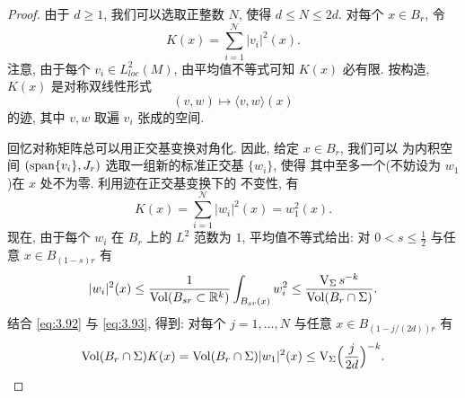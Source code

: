 \begin{proof}
由于 $d\geq1$, 我们可以选取正整数 $N$, 使得 $d\leq N\leq2d$. 对每个
$x\in B_r$, 令
\begin{equation}
K(x)=\sum_{i=1}^{\mathcal{N}}|v_i|^2(x).
\label{eq:3.90}
\end{equation}
注意, 由于每个 $v_i\in L^2_{loc}(M)$, 由平均值不等式可知 $K(x)$ 必有限.
按构造, $K(x)$ 是对称双线性形式
\begin{equation}
(v,w)\mapsto\langle v,w\rangle(x)
\label{eq:3.91}
\end{equation}
的迹, 其中 $v,w$ 取遍 $v_i$ 张成的空间.

回忆对称矩阵总可以用正交基变换对角化. 因此, 给定 $x\in B_r$, 我们可以
为内积空间 $(\operatorname{span}\{v_i\},J_r)$ 选取一组新的标准正交基 $\{w_i\}$, 使得
其中至多一个(不妨设为 $w_1$)在 $x$ 处不为零. 利用迹在正交基变换下的
不变性, 有
\begin{equation}
K(x)=\sum_{i=1}^{\mathcal{N}}|w_i|^2(x)=w_1^2(x).
\label{eq:3.92}
\end{equation}
现在, 由于每个 $w_i$ 在 $B_r$ 上的 $L^2$ 范数为 $1$, 平均值不等式给出:
对 $0<s\leq\frac12$ 与任意 $x\in B_{(1-s)r}$ 有
\begin{equation}
|w_i|^2(x)\leq\frac{1}{\operatorname{Vol}(B_{sr}\subset\mathbb{R}^k)}
 \int_{B_{sr}(x)}w_i^2
 \leq\frac{\mathrm{V}_\Sigma\,s^{-k}}{\operatorname{Vol}(B_r\cap\Sigma)}.
\label{eq:3.93}
\end{equation}
结合 \eqref{eq:3.92} 与 \eqref{eq:3.93}, 得到: 对每个 $j=1,\dots,N$ 与任意
$x\in B_{(1-j/(2d))r}$ 有
\begin{equation}
\operatorname{Vol}(B_r\cap\Sigma)K(x)
 =\operatorname{Vol}(B_r\cap\Sigma)|w_1|^2(x)
 \leq\mathrm{V}_\Sigma\Bigl(\frac{j}{2d}\Bigr)^{-k}.
\label{eq:3.94}
\end{equation}


\end{proof}
